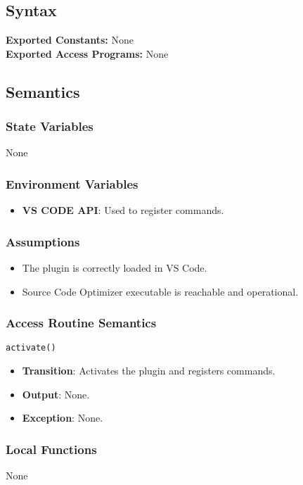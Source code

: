 \documentclass[12pt, titlepage]{article}
\begin{document}
\subsection{Syntax}

\textbf{Exported Constants:} None\\
\noindent \textbf{Exported Access Programs:}
None


\subsection{Semantics}

\subsubsection{State Variables}
None

\subsubsection{Environment Variables}
\begin{itemize}
    \item \textbf{VS CODE API}: Used to register commands.
\end{itemize}

\subsubsection{Assumptions}
\begin{itemize}
\item The plugin is correctly loaded in VS Code.
\item Source Code Optimizer executable is reachable and operational.
\end{itemize}

\subsubsection{Access Routine Semantics}
\texttt{activate()}
\begin{itemize}
\item \textbf{Transition}: Activates the plugin and registers commands.
\item \textbf{Output}: None.
\item \textbf{Exception}: None.
\end{itemize}

\subsubsection{Local Functions}
None
\end{document}

